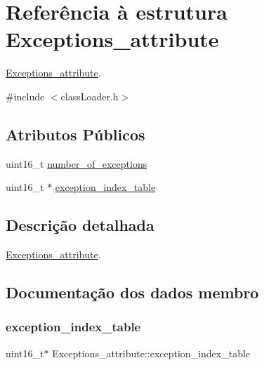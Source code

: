 \hypertarget{struct_exceptions__attribute}{}\section{Referência à estrutura Exceptions\+\_\+attribute}
\label{struct_exceptions__attribute}


\hyperlink{struct_exceptions__attribute}{Exceptions\+\_\+attribute}.  




{\ttfamily \#include $<$class\+Loader.\+h$>$}

\subsection*{Atributos Públicos}
\begin{DoxyCompactItemize}
\item 
uint16\+\_\+t \hyperlink{struct_exceptions__attribute_a407848f89bd4b856a9edb6bc358f4b0d}{number\+\_\+of\+\_\+exceptions}
\item 
uint16\+\_\+t $\ast$ \hyperlink{struct_exceptions__attribute_a0e297dc82cf5e4ed44822a5ca3fa3794}{exception\+\_\+index\+\_\+table}
\end{DoxyCompactItemize}


\subsection{Descrição detalhada}
\hyperlink{struct_exceptions__attribute}{Exceptions\+\_\+attribute}. 

\subsection{Documentação dos dados membro}
\hypertarget{struct_exceptions__attribute_a0e297dc82cf5e4ed44822a5ca3fa3794}{}\label{struct_exceptions__attribute_a0e297dc82cf5e4ed44822a5ca3fa3794} 
\subsubsection{\texorpdfstring{exception\+\_\+index\+\_\+table}{exception\_index\_table}}
{\footnotesize\ttfamily uint16\+\_\+t$\ast$ Exceptions\+\_\+attribute\+::exception\+\_\+index\+\_\+table}

